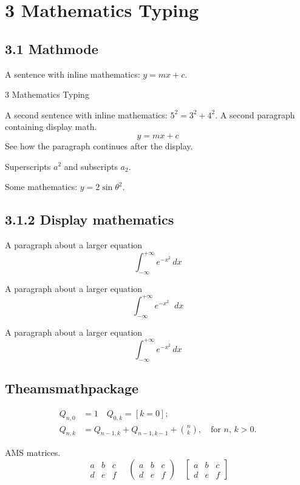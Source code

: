 \documentclass[a4paper]{article}
\newcommand{\diff}{\mathop{}\!d}
\begin{document}
\section*{3 Mathematics Typing}
\subsection*{ 3.1 Mathmode}
 A sentence with inline mathematics: \( y = mx + c \).

3 Mathematics Typing
 
 A second sentence with inline mathematics:
 $5^{2}=3^{2}+4^{2}$.
 A second paragraph containing display math.
 \[
 y = mx + c
 \]
 See how the paragraph continues after the display.


 Superscripts $a^{2}$ and subscripts $a_{2}$.

 Some mathematics: $y = 2 \sin \theta^{2}$.



\subsection*{ 3.1.2 Display mathematics}

 A paragraph about a larger equation
 \[
 \int_{-\infty}^{+\infty} e^{-x^2} \, dx
 \]


 A paragraph about a larger equation
 \[
 \int_{-\infty}^{+\infty} e^{-x^2} \diff x
 \]

 A paragraph about a larger equation
 \begin{equation}
 \int_{-\infty}^{+\infty} e^{-x^2} \, dx
 \end{equation}


\subsection*{Theamsmathpackage}

 \begin{align*}
 Q_{n,0} &= 1 \quad Q_{0,k} = [k=0]; \\
 Q_{n,k} &= Q_{n-1,k}+Q_{n-1,k-1}+\binom{n}{k},
 \quad\text{for $n$, $k>0$.}
 \end{align*}

 AMS matrices.
 \[
 \begin{matrix}
 a & b & c \\
 d & e & f
 \end{matrix}
 \quad
 \begin{pmatrix}
 a & b & c \\
 d & e & f
 \end{pmatrix}
 \quad
 \begin{bmatrix}
 a & b & c \\
 d & e & f
 \end{bmatrix}
 \]
\end{document}
